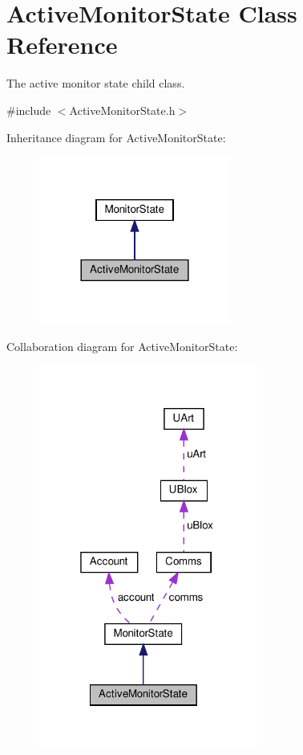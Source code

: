 \hypertarget{class_active_monitor_state}{}\section{Active\+Monitor\+State Class Reference}
\label{class_active_monitor_state}


The active monitor state child class.  




{\ttfamily \#include $<$Active\+Monitor\+State.\+h$>$}



Inheritance diagram for Active\+Monitor\+State\+:\nopagebreak
\begin{figure}[H]
\begin{center}
\leavevmode
\includegraphics[width=180pt]{dd/d2b/class_active_monitor_state__inherit__graph}
\end{center}
\end{figure}


Collaboration diagram for Active\+Monitor\+State\+:\nopagebreak
\begin{figure}[H]
\begin{center}
\leavevmode
\includegraphics[width=205pt]{d5/d71/class_active_monitor_state__coll__graph}
\end{center}
\end{figure}
